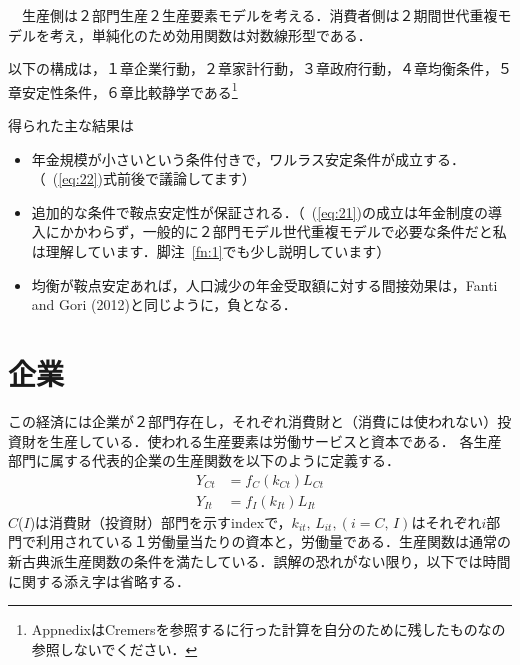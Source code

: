 \documentclass[12pt,a4paper]{jsarticle}
\begin{document}
　生産側は２部門生産２生産要素モデルを考える．消費者側は２期間世代重複モデルを考え，単純化のため効用関数は対数線形型である．

以下の構成は，１章企業行動，２章家計行動，３章政府行動，４章均衡条件，５章安定性条件，６章比較静学である\footnote{AppnedixはCremersを参照するに行った計算を自分のために残したものなの参照しないでください．}

得られた主な結果は
\begin{itemize}
 \item 年金規模が小さいという条件付きで，ワルラス安定条件が成立する．（~(\ref{eq:22})式前後で議論してます）
 \item 追加的な条件で鞍点安定性が保証される．（~(\ref{eq:21})の成立は年金制度の導入にかかわらず，一般的に２部門モデル世代重複モデルで必要な条件だと私は理解しています．脚注~\ref{fn:1}でも少し説明しています）
 \item 均衡が鞍点安定あれば，人口減少の年金受取額に対する間接効果は，Fanti and Gori (2012)と同じように，負となる．
\end{itemize}

\section{企業}
この経済には企業が２部門存在し，それぞれ消費財と（消費には使われない）投資財を生産している．使われる生産要素は労働サービスと資本である．
各生産部門に属する代表的企業の生産関数を以下のように定義する．
\begin{align}
 Y_{Ct} &= f_{C}(k_{Ct}) L_{Ct}  \\
 Y_{It} &= f_{I}(k_{It}) L_{It}
\end{align}
$C$($I$)は消費財（投資財）部門を示すindexで，$k_{it}, \, L_{it}, (i=C, \, I)$はそれぞれ$i$部門で利用されている１労働量当たりの資本と，労働量である．生産関数は通常の新古典派生産関数の条件を満たしている．誤解の恐れがない限り，以下では時間に関する添え字は省略する．
%
\end{document}
